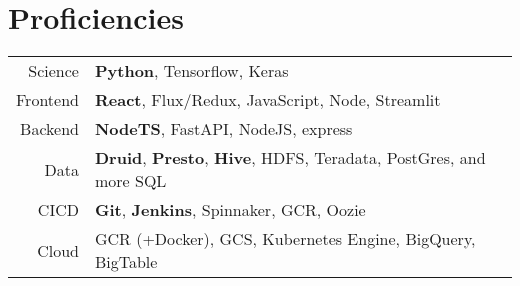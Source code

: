 \documentclass[a4paper, 9pt]{article} %
\begin{document}
\vspace{-8pt}
\section{Proficiencies}

\begin{tabular}{rlp{11cm}}
Science &\textbf{Python}, Tensorflow, Keras\\
Frontend &\textbf{React}, Flux/Redux, JavaScript, Node, Streamlit\\
Backend &\textbf{NodeTS}, FastAPI, NodeJS, express\\
Data &\textbf{Druid}, \textbf{Presto}, \textbf{Hive}, HDFS, Teradata, PostGres, and more SQL\\
CICD &\textbf{Git}, \textbf{Jenkins}, Spinnaker, GCR, Oozie\\
Cloud &GCR (+Docker), GCS, Kubernetes Engine, BigQuery, BigTable



\end{tabular}



\end{document}
